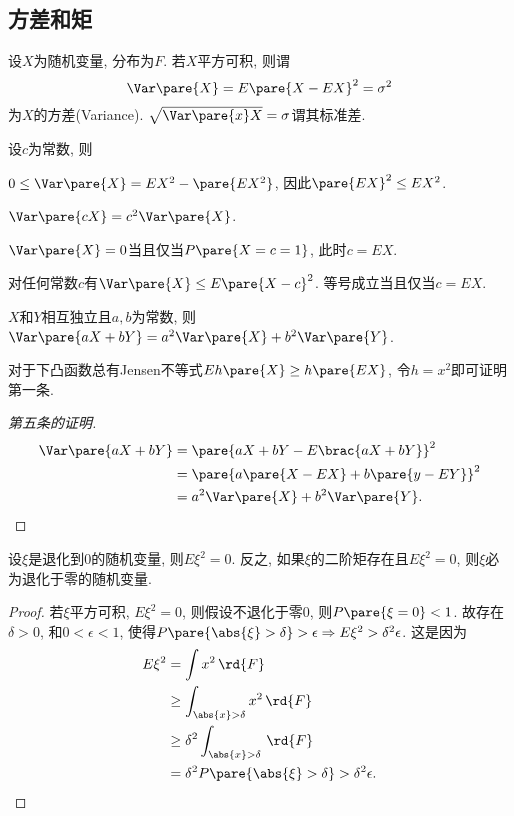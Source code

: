 \documentclass[../Statistics.tex]{subfiles}
\begin{document}

\subsection{方差和矩} %
\label{sub:方差和矩}

\begin{definition}
    设$X$为随机变量, 分布为$F$. 若$X$平方可积, 则谓
    \[ \Var\pare{X} = E\pare{X-EX}^2 = \sigma^2 \]
    为$X$的方差(Variance). $\sqrt{\Var\pare{x}X} = \sigma$谓其标准差.
\end{definition}
\begin{theorem}
    设$c$为常数, 则
    \begin{cenum}
        \item $0 \le \Var\pare{X} = EX^2 - \pare{EX^2}$, 因此$\pare{EX}^2 \le EX^2$.
        \item $\Var\pare{cX} = c^2 \Var\pare{X}$.
        \item $\Var\pare{X} = 0$当且仅当$P\pare{X=c=1}$, 此时$c=EX$.
        \item 对任何常数$c$有$\Var\pare{X} \le E\pare{X-c}^2$. 等号成立当且仅当$c=EX$.
        \item $X$和$Y$相互独立且$a,b$为常数, 则$\Var\pare{aX+bY} = a^2\Var\pare{X} + b^2\Var\pare{Y}$.
    \end{cenum}
\end{theorem}
\begin{remark}
    对于下凸函数总有Jensen不等式$Eh\pare{X} \ge h\pare{EX}$, 令$h = x^2$即可证明第一条.
\end{remark}
\begin{proof}[第五条的证明]
    \begin{align*}
        \Var\pare{aX+bY} &= \pare{aX+bY - E\brac{aX+bY}}^2 \\
        &= \pare{a\pare{X-EX}+b\pare{y-EY}}^2 \\
        &= a^2\Var\pare{X} + b^2\Var\pare{Y}. \qedhere
    \end{align*}
\end{proof}
\begin{lemma}
    \label{lem:二阶退化随机变量}
    设$\xi$是退化到$0$的随机变量, 则$E\xi^2 = 0$. 反之, 如果$\xi$的二阶矩存在且$E\xi^2 = 0$, 则$\xi$必为退化于零的随机变量.
\end{lemma}
\begin{proof}
    若$\xi$平方可积, $E\xi^2 = 0$, 则假设不退化于零$0$, 则$P\pare{\xi = 0} < 1$. 故存在$\delta > 0$, 和$0<\epsilon < 1$, 使得$P\pare{\abs{\xi} > \delta} > \epsilon \Rightarrow E\xi^2 > \delta^2\epsilon$. 这是因为
    \begin{align*}
        E\xi^2 &= \int x^2\,\rd{F} \\
        &\ge \int_{\abs{x}>\delta} x^2\,\rd{F} \\
        &\ge \delta^2 \int_{\abs{x}>\delta} \,\rd{F} \\
        &= \delta^2 P\pare{\abs{\xi}>\delta} > \delta^2\epsilon. \qedhere
    \end{align*}
\end{proof}
\end{document}

